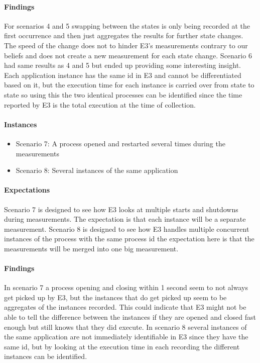\paragraph{Findings}
For scenarios 4 and 5 swapping between the states is only being recorded at the first occurrence and then just aggregates the results for further state changes. The speed of the change does not to hinder E3's measurements contrary to our beliefs and does not create a new measurement for each state change. Scenario 6 had same results as 4 and 5 but ended up providing some interesting insight. Each application instance has the same id in E3 and cannot be differentiated based on it, but the execution time for each instance is carried over from state to state so using this the two identical processes can be identified since the time reported by E3 is the total execution at the time of collection.

\paragraph{Instances}

\begin{itemize}
    \item Scenario 7: A process opened and restarted several times during the measurements
    \item Scenario 8: Several instances of the same application
\end{itemize}

\paragraph{Expectations}
Scenario 7 is designed to see how E3 looks at multiple starts and shutdowns during measurements. The expectation is that each instance will be a separate measurement. Scenario 8 is designed to see how E3 handles multiple concurrent instances of the process with the same process id the expectation here is that the measurements will be merged into one big measurement. 
\paragraph{Findings}
In scenario 7 a process opening and closing within 1 second seem to not always get picked up by E3, but the instances that do get picked up seem to be aggregates of the instances recorded. This could indicate that E3 might not be able to tell the difference between the instances if they are opened and closed fast enough but still knows that they did execute. In scenario 8 several instances of the same application are not immediately identifiable in E3 since they have the same id, but by looking at the execution time in each recording the different instances can be identified.

